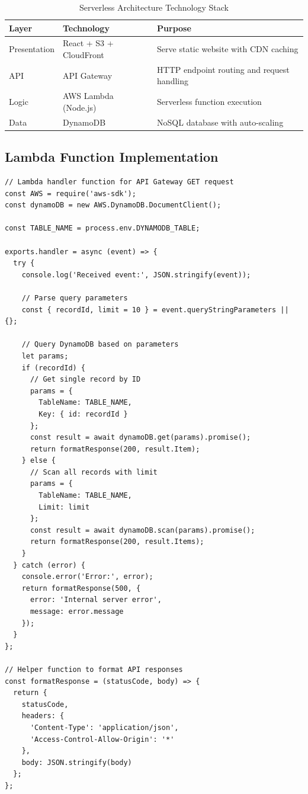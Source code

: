\begin{table}[h]
    \centering
    \begin{tabularx}{\textwidth}{|l|l|X|}
        \hline
        \textbf{Layer} & \textbf{Technology} & \textbf{Purpose} \\
        \hline
        Presentation & React + S3 + CloudFront & Serve static website with CDN caching \\
        \hline
        API & API Gateway & HTTP endpoint routing and request handling \\
        \hline
        Logic & AWS Lambda (Node.js) & Serverless function execution \\
        \hline
        Data & DynamoDB & NoSQL database with auto-scaling \\
        \hline
    \end{tabularx}
    \caption{Serverless Architecture Technology Stack}
\end{table}

\subsection{Lambda Function Implementation}

\begin{lstlisting}[basicstyle=\ttfamily\small, caption=AWS Lambda Handler for GET Records, captionpos=b]
// Lambda handler function for API Gateway GET request
const AWS = require('aws-sdk');
const dynamoDB = new AWS.DynamoDB.DocumentClient();

const TABLE_NAME = process.env.DYNAMODB_TABLE;

exports.handler = async (event) => {
  try {
    console.log('Received event:', JSON.stringify(event));
    
    // Parse query parameters
    const { recordId, limit = 10 } = event.queryStringParameters || {};
    
    // Query DynamoDB based on parameters
    let params;
    if (recordId) {
      // Get single record by ID
      params = {
        TableName: TABLE_NAME,
        Key: { id: recordId }
      };
      const result = await dynamoDB.get(params).promise();
      return formatResponse(200, result.Item);
    } else {
      // Scan all records with limit
      params = {
        TableName: TABLE_NAME,
        Limit: limit
      };
      const result = await dynamoDB.scan(params).promise();
      return formatResponse(200, result.Items);
    }
  } catch (error) {
    console.error('Error:', error);
    return formatResponse(500, { 
      error: 'Internal server error',
      message: error.message 
    });
  }
};

// Helper function to format API responses
const formatResponse = (statusCode, body) => {
  return {
    statusCode,
    headers: {
      'Content-Type': 'application/json',
      'Access-Control-Allow-Origin': '*'
    },
    body: JSON.stringify(body)
  };
};
\end{lstlisting}

